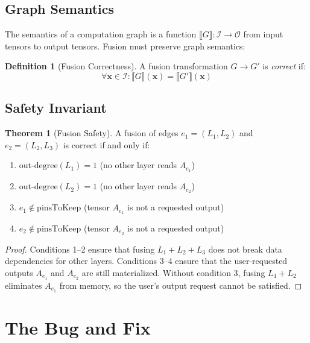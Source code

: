 \documentclass[12pt]{article}
\theoremstyle{definition}
\newtheorem{definition}{Definition}
\newtheorem{theorem}{Theorem}
\begin{document}
\subsection{Graph Semantics}

The semantics of a computation graph is a function $\llbracket G \rrbracket : \mathcal{I} \to \mathcal{O}$ from input tensors to output tensors. Fusion must preserve graph semantics:

\begin{definition}[Fusion Correctness]
A fusion transformation $G \to G'$ is \emph{correct} if:
\begin{equation}
\forall \mathbf{x} \in \mathcal{I} : \llbracket G \rrbracket(\mathbf{x}) = \llbracket G' \rrbracket(\mathbf{x})
\end{equation}
\end{definition}

\subsection{Safety Invariant}

\begin{theorem}[Fusion Safety]
A fusion of edges $e_1 = (L_1, L_2)$ and $e_2 = (L_2, L_3)$ is correct if and only if:
\begin{enumerate}
  \item $\text{out-degree}(L_1) = 1$ (no other layer reads $A_{e_1}$)
  \item $\text{out-degree}(L_2) = 1$ (no other layer reads $A_{e_2}$)
  \item $e_1 \notin \text{pinsToKeep}$ (tensor $A_{e_1}$ is not a requested output)
  \item $e_2 \notin \text{pinsToKeep}$ (tensor $A_{e_2}$ is not a requested output)
\end{enumerate}
\end{theorem}

\begin{proof}
Conditions 1--2 ensure that fusing $L_1+L_2+L_3$ does not break data dependencies for other layers. Conditions 3--4 ensure that the user-requested outputs $A_{e_1}$ and $A_{e_2}$ are still materialized. Without condition 3, fusing $L_1+L_2$ eliminates $A_{e_1}$ from memory, so the user's output request cannot be satisfied.
\end{proof}

\section{The Bug and Fix}
\end{document}
